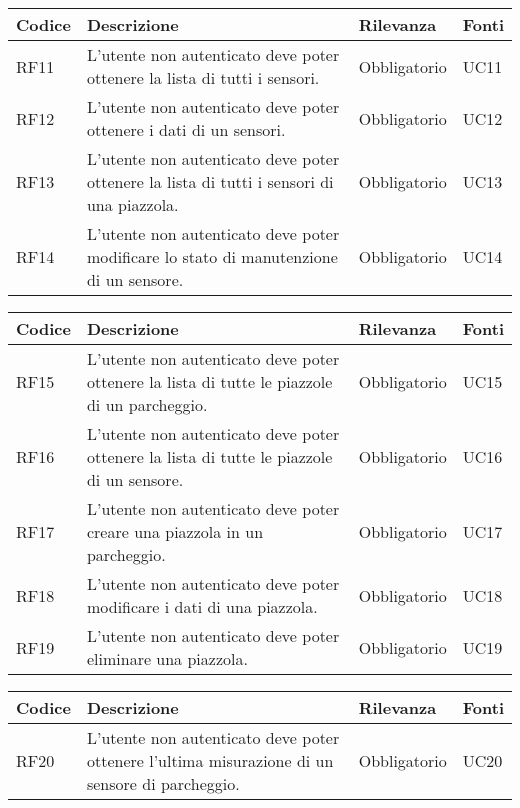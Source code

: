 \leavevmode\newline
\begin{table}
    \begin{tabular}{|p{1cm}|p{6cm}|p{1.9cm}|p{1cm}|} 
    \hline
    Codice & Descrizione & Rilevanza &  Fonti \\ 
    \hline
    RF11 & L'utente non autenticato deve poter ottenere la lista di tutti i sensori. & Obbligatorio & UC11 \\ 
    \hline
    RF12 & L'utente non autenticato deve poter ottenere i dati di un sensori. & Obbligatorio & UC12 \\ 
    \hline
    RF13 & L'utente non autenticato deve poter ottenere la lista di tutti i sensori di una piazzola. & Obbligatorio & UC13 \\ 
    \hline
    RF14 & L'utente non autenticato deve poter modificare lo stato di manutenzione di un sensore. & Obbligatorio & UC14 \\ 
    \hline
    \end{tabular}
\end{table}

\leavevmode\newline
\begin{table}
    \begin{tabular}{|p{1cm}|p{6cm}|p{1.9cm}|p{1cm}|} 
    \hline
    Codice & Descrizione & Rilevanza &  Fonti \\ 
    \hline
    RF15 & L'utente non autenticato deve poter ottenere la lista di tutte le piazzole di un parcheggio. & Obbligatorio & UC15 \\ 
    \hline
    RF16 & L'utente non autenticato deve poter ottenere la lista di tutte le piazzole di un sensore. & Obbligatorio & UC16 \\ 
    \hline
    RF17 & L'utente non autenticato deve poter creare una piazzola in un parcheggio. & Obbligatorio & UC17 \\ 
    \hline
    RF18 & L'utente non autenticato deve poter modificare i dati di una piazzola. & Obbligatorio & UC18 \\
    \hline
    RF19 & L'utente non autenticato deve poter eliminare una piazzola. & Obbligatorio & UC19 \\
    \hline
    \end{tabular}
\end{table}

\leavevmode\newline
\begin{table}
    \begin{tabular}{|p{1cm}|p{6cm}|p{1.9cm}|p{1cm}|} 
    \hline
    Codice & Descrizione & Rilevanza &  Fonti \\ 
    \hline
    RF20 & L'utente non autenticato deve poter ottenere l'ultima misurazione di un sensore di parcheggio. & Obbligatorio & UC20 \\ 
    \hline
    \end{tabular}
\end{table}

